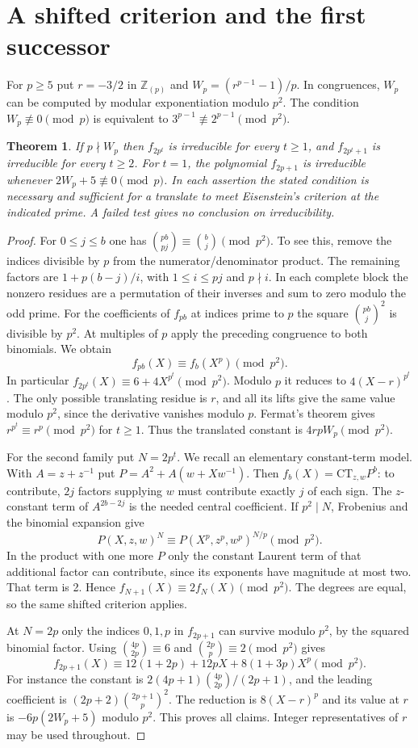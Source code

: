 \documentclass[11pt]{article}
\newtheorem{theorem}{Theorem}\newtheorem{lemma}[theorem]{Lemma}
\begin{document}
\section{A shifted criterion and the first successor}
For $p\ge5$ put $r=-3/2$ in $\mathbb Z_{(p)}$ and $W_p=(r^{p-1}-1)/p$. In congruences, $W_p$ can be computed by modular exponentiation modulo $p^2$. The condition $W_p\not\equiv0\pmod p$ is equivalent to $3^{p-1}\not\equiv2^{p-1}\pmod {p^2}$.
\begin{theorem}\label{shifted}
If $p\nmid W_p$ then $f_{2p^t}$ is irreducible for every $t\ge1$, and $f_{2p^t+1}$ is irreducible for every $t\ge2$. For $t=1$, the polynomial $f_{2p+1}$ is irreducible whenever $2W_p+5\not\equiv0\pmod p$. In each assertion the stated condition is necessary and sufficient for a translate to meet Eisenstein's criterion at the indicated prime. A failed test gives no conclusion on irreducibility.
\end{theorem}
\begin{proof}
For $0\le j\le b$ one has $\binom{pb}{pj}\equiv\binom bj\pmod {p^2}$. To see this, remove the indices divisible by $p$ from the numerator/denominator product. The remaining factors are $1+p(b-j)/i$, with $1\le i\le pj$ and $p\nmid i$. In each complete block the nonzero residues are a permutation of their inverses and sum to zero modulo the odd prime. For the coefficients of $f_{pb}$ at indices prime to $p$ the square $\binom{pb}{j}^2$ is divisible by $p^2$. At multiples of $p$ apply the preceding congruence to both binomials. We obtain
\[
 f_{pb}(X)\equiv f_b(X^p)\pmod {p^2} .
\]
In particular $f_{2p^t}(X)\equiv 6+4X^{p^t}\pmod {p^2}$. Modulo $p$ it reduces to $4(X-r)^{p^t}$. The only possible translating residue is $r$, and all its lifts give the same value modulo $p^2$, since the derivative vanishes modulo $p$. Fermat's theorem gives $r^{p^t}\equiv r^p\pmod {p^2}$ for $t\ge1$. Thus the translated constant is $4r p W_p\pmod{p^2}$.

For the second family put $N=2p^t$. We recall an elementary constant-term model. With $A=z+z^{-1}$ put $P=A^2+A(w+Xw^{-1})$. Then $f_b(X)=\mathrm{CT}_{z,w}P^b$: to contribute, $2j$ factors supplying $w$ must contribute exactly $j$ of each sign. The $z$-constant term of $A^{2b-2j}$ is the needed central coefficient. If $p^2\mid N$, Frobenius and the binomial expansion give
\[
 P(X,z,w)^N\equiv P(X^p,z^p,w^p)^{N/p}\pmod {p^2}.
\]
In the product with one more $P$ only the constant Laurent term of that additional factor can contribute, since its exponents have magnitude at most two. That term is 2. Hence $f_{N+1}(X)\equiv2f_N(X)\pmod{p^2}$. The degrees are equal, so the same shifted criterion applies.

At $N=2p$ only the indices $0,1,p$ in $f_{2p+1}$ can survive modulo $p^2$, by the squared binomial factor. Using $\binom{4p}{2p}\equiv6$ and $\binom{2p}p\equiv2\pmod{p^2}$ gives
\[
 f_{2p+1}(X)\equiv12(1+2p)+12pX+8(1+3p)X^p\pmod{p^2}.
\]
For instance the constant is $2(4p+1)\binom{4p}{2p}/(2p+1)$, and the leading coefficient is $(2p+2)\binom{2p+1}p^2$. The reduction is $8(X-r)^p$ and its value at $r$ is $-6p(2W_p+5)$ modulo $p^2$. This proves all claims. Integer representatives of $r$ may be used throughout.\end{proof}
\end{document}
